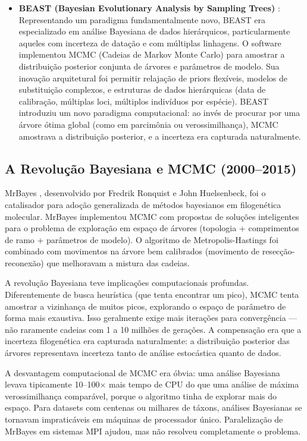 \begin{itemize}
\item \textbf{BEAST (Bayesian Evolutionary Analysis by Sampling Trees)} \parencite{drummond2007}: Representando um paradigma fundamentalmente novo, BEAST era especializado em análise Bayesiana de dados hierárquicos, particularmente aqueles com incerteza de datação e com múltiplas linhagens. O software implementou MCMC (Cadeias de Markov Monte Carlo) para amostrar a distribuição posterior conjunta de árvores e parâmetros de modelo. Sua inovação arquitetural foi permitir relajação de priors flexíveis, modelos de substituição complexos, e estruturas de dados hierárquicas (data de calibração, múltiplas loci, múltiplos indivíduos por espécie). BEAST introduziu um novo paradigma computacional: ao invés de procurar por uma árvore ótima global (como em parcimônia ou verossimilhança), MCMC amostrava a distribuição posterior, e a incerteza era capturada naturalmente.

\end{itemize}

\subsection{A Revolução Bayesiana e MCMC (2000--2015)}

MrBayes \parencite{ronquist2003}, desenvolvido por Fredrik Ronquist e John Huelsenbeck, foi o catalisador para adoção generalizada de métodos bayesianos em filogenética molecular. MrBayes implementou MCMC com propostas de soluções inteligentes para o problema de exploração em espaço de árvores (topologia + comprimentos de ramo + parâmetros de modelo). O algoritmo de Metropolis-Hastings foi combinado com movimentos na árvore bem calibrados (movimento de resecção-reconexão) que melhoravam a mistura das cadeias.

A revolução Bayesiana teve implicações computacionais profundas. Diferentemente de busca heurística (que tenta encontrar um pico), MCMC tenta amostrar a vizinhança de muitos picos, explorando o espaço de parâmetro de forma mais exaustiva. Isso geralmente exige mais iterações para convergência --- não raramente cadeias com 1 a 10 milhões de gerações. A compensação era que a incerteza filogenética era capturada naturalmente: a distribuição posterior das árvores representava incerteza tanto de análise estocástica quanto de dados.

A desvantagem computacional de MCMC era óbvia: uma análise Bayesiana levava tipicamente 10--100$\times$ mais tempo de CPU do que uma análise de máxima verossimilhança comparável, porque o algoritmo tinha de explorar mais do espaço. Para datasets com centenas ou milhares de táxons, análises Bayesianas se tornavam impraticáveis em máquinas de processador único. Paralelização de MrBayes em sistemas MPI ajudou, mas não resolveu completamente o problema.

